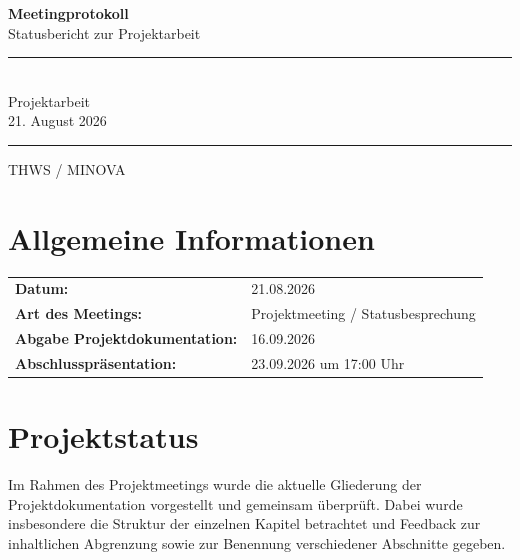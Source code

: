 \documentclass[a4paper,11pt]{article}
\begin{document}
\begin{titlepage}

\centering

\vspace*{3cm}

{\Huge \textbf{Meetingprotokoll}}\\[0.5cm]

{\Large Statusbericht zur Projektarbeit}\\[2cm]

\rule{12cm}{0.5pt}\\[0.5cm]

{\Large Projektarbeit}\\[0.3cm]

{\large 21. August 2026}

\rule{12cm}{0.5pt}

\vfill

{\large THWS / MINOVA}

\end{titlepage}

\tableofcontents
\newpage


\section{Allgemeine Informationen}

\begin{tabular}{ll}
\textbf{Datum:} & 21.08.2026 \\
\textbf{Art des Meetings:} & Projektmeeting / Statusbesprechung \\
\textbf{Abgabe Projektdokumentation:} & 16.09.2026 \\
\textbf{Abschlusspräsentation:} & 23.09.2026 um 17:00 Uhr \\
\end{tabular}

\vspace{1cm}

\section{Projektstatus}

Im Rahmen des Projektmeetings wurde die aktuelle Gliederung der
Projektdokumentation vorgestellt und gemeinsam überprüft. Dabei wurde
insbesondere die Struktur der einzelnen Kapitel betrachtet und Feedback
zur inhaltlichen Abgrenzung sowie zur Benennung verschiedener Abschnitte
gegeben.
\end{document}
